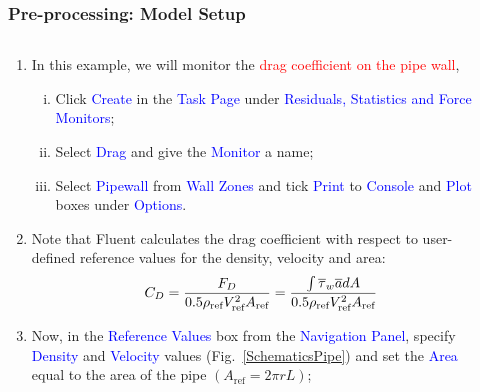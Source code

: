\documentclass[10pt,compress, unknownkeysallowed]{beamer}
\newcommand{\frc}{\displaystyle\frac}
\newcommand{\red}{\textcolor{red}}
\newcommand{\blue}{\textcolor{blue}}
\begin{document}
\begin{frame}
  \frametitle{Pre-processing: Model Setup}
    \begin{columns}
        \begin{column}[l]{0.5\linewidth}
           \begin{enumerate}\scriptsize\setcounter{enumi}{20}
                \item<1-> In this example, we will monitor the \red{drag coefficient on the pipe wall},
                    \begin{enumerate}[i)]\scriptsize
                       \item<1-> Click \blue{Create} in the \blue{Task Page} under \blue{Residuals, Statistics and Force Monitors};
                       \item<1-> Select \blue{Drag} and give the \blue{Monitor} a name;
                       \item<1-> Select \blue{Pipewall} from \blue{Wall Zones} and tick \blue{Print} to \blue{Console} and \blue{Plot} boxes under \blue{Options}.
                    \end{enumerate}
                \item<2-> Note that Fluent calculates the drag coefficient with respect to user-defined reference values for the density, velocity and area:
                      \begin{displaymath}\scriptsize
                          C_{D} = \frc{F_{D}}{0.5\rho_{\text{ref}}V^{2}_{\text{ref}}A_{\text{ref}}} = \frc{\int\overline{\tau}_{w}\overline{a}dA}{0.5\rho_{\text{ref}}V^{2}_{\text{ref}}A_{\text{ref}}}
                      \end{displaymath}
                \item<3-> Now, in the \blue{Reference Values} box from the \blue{Navigation Panel}, specify \blue{Density} and \blue{Velocity} values (Fig.~\ref{SchematicsPipe}) and set the \blue{Area} equal to the area of the pipe $\left(A_{\text{ref}}=2\pi r L\right)$;    
           \end{enumerate}
        \end{column}
           \begin{column}[l]{0.5\linewidth}
\end{column}
\end{columns}
\end{frame}
\end{document}
